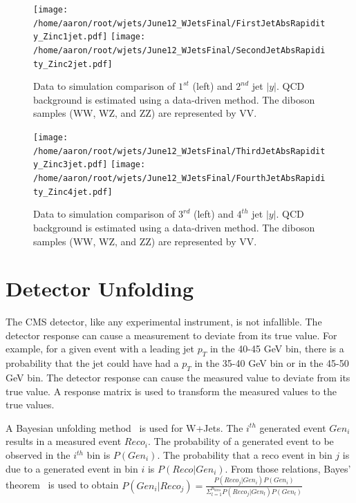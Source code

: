 \documentclass[oneside, letterpaper, oldfontcommands]{memoir}
\begin{document}
\begin{figure}[!Hhtbp]
\begin{center}
\texttt{[image: /home/aaron/root/wjets/June12\_WJetsFinal/FirstJetAbsRapidity\_Zinc1jet.pdf]}
\texttt{[image: /home/aaron/root/wjets/June12\_WJetsFinal/SecondJetAbsRapidity\_Zinc2jet.pdf]}
\end{center}
\caption{Data to simulation comparison of $1^{st}$ (left) and $2^{nd}$ jet $|y|$. QCD background is estimated using a data-driven method. The diboson samples (WW, WZ, and ZZ) are represented by VV.}
\label{eta12}
\end{figure}

\begin{figure}[!Hhtbp]
\begin{center}
\texttt{[image: /home/aaron/root/wjets/June12\_WJetsFinal/ThirdJetAbsRapidity\_Zinc3jet.pdf]}
\texttt{[image: /home/aaron/root/wjets/June12\_WJetsFinal/FourthJetAbsRapidity\_Zinc4jet.pdf]}
\end{center}
\caption{Data to simulation comparison of $3^{rd}$ (left) and $4^{th}$ jet $|y|$. QCD background is estimated using a data-driven method. The diboson samples (WW, WZ, and ZZ) are represented by VV.}
\label{eta34}
\end{figure}


\section{Detector Unfolding}
\qquad The CMS detector, like any experimental instrument, is not infallible. The detector response can cause a measurement to deviate from its true value. For example, for a given event with a leading jet $p_{T}$ in the 40-45 GeV bin, there is a probability that the jet could have had a $p_{T}$ in the 35-40 GeV bin or in the 45-50 GeV bin. The detector response can cause the measured value to deviate from its true value. A response matrix is used to transform the measured values to the true values. 

\qquad A Bayesian unfolding method~\cite{D'Agostini:1995487} is used for W+Jets. The $i^{th}$ generated event $Gen_{i}$ results in a measured event $Reco_{i}$. The probability of a generated event to be observed in the $i^{th}$ bin is $P(Gen_{i})$. The probability that a reco event in bin $j$ is due to a generated event in bin $i$ is $P(Reco|Gen_{i})$. From those relations, Bayes' theorem~\cite{BevingtonRobinson200207} is used to obtain $P(Gen_{i}|Reco_{j}) = \frac{P(Reco_{j}|Gen_{i})P(Gen_{i})}{\Sigma_{l=1}^{n_{bins}}P(Reco_{j}|Gen_{l})P(Gen_{l})}$
\end{document}
